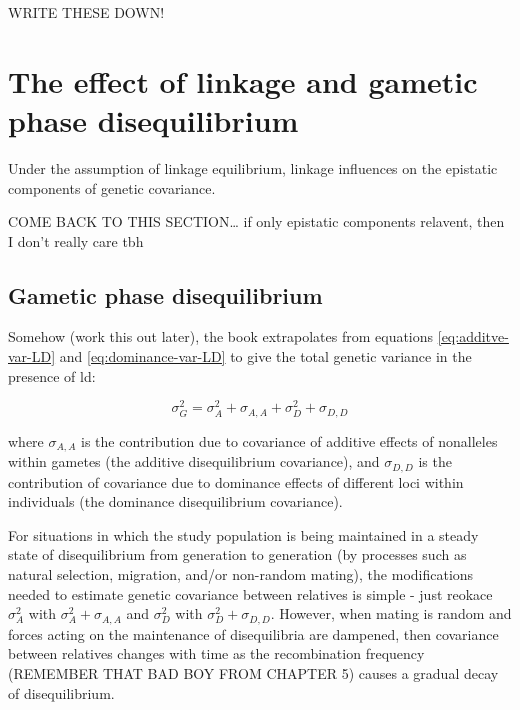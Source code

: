 \documentclass[
]{book}
\begin{document}
WRITE THESE DOWN!

\hypertarget{the-effect-of-linkage-and-gametic-phase-disequilibrium}{%
\section{The effect of linkage and gametic phase disequilibrium}\label{the-effect-of-linkage-and-gametic-phase-disequilibrium}}

Under the assumption of linkage equilibrium, linkage influences on the epistatic components of genetic covariance.

COME BACK TO THIS SECTION\ldots{} if only epistatic components relavent, then I don't really care tbh

\hypertarget{gametic-phase-disequilibrium}{%
\subsection{Gametic phase disequilibrium}\label{gametic-phase-disequilibrium}}

Somehow (work this out later), the book extrapolates from equations \eqref{eq:additve-var-LD} and \eqref{eq:dominance-var-LD} to give the total genetic variance in the presence of ld:

\begin{equation}
    \sigma^2_{G} = \sigma^2_{A} + \sigma_{A,A} + \sigma^2_{D} + \sigma_{D,D}
    \label{eq:total-genetic-variance-ld}
\end{equation}

where \(\sigma_{A,A}\) is the contribution due to covariance of additive effects of nonalleles within gametes (the additive disequilibrium covariance), and \(\sigma_{D,D}\) is the contribution of covariance due to dominance effects of different loci within individuals (the dominance disequilibrium covariance).

For situations in which the study population is being maintained in a steady state of disequilibrium from generation to generation (by processes such as natural selection, migration, and/or non-random mating), the modifications needed to estimate genetic covariance between relatives is simple - just reokace \(\sigma^2_{A}\) with \(\sigma^2_{A} + \sigma_{A,A}\) and \(\sigma^2_{D}\) with \(\sigma^2_{D} + \sigma_{D,D}\). However, when mating is random and forces acting on the maintenance of disequilibria are dampened, then covariance between relatives changes with time as the recombination frequency (REMEMBER THAT BAD BOY FROM CHAPTER 5) causes a gradual decay of disequilibrium.
\end{document}
